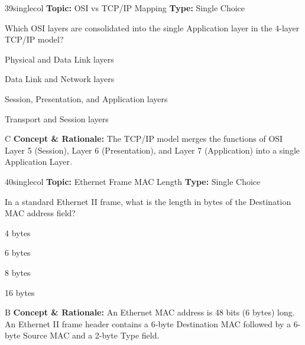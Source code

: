 \begin{qcard}{39}{singlecol}
\textcolor{darkslate!75}{\small\textbf{Topic:} OSI vs TCP/IP Mapping \hfill \textbf{Type:} Single Choice}\vspace{0.4em}\par
Which OSI layers are consolidated into the single Application layer in the 4-layer TCP/IP model?
\begin{qoptions}
\item Physical and Data Link layers
\item Data Link and Network layers
\item Session, Presentation, and Application layers
\item Transport and Session layers
\end{qoptions}
\end{qcard}
\nopagebreak
\begin{explainbox}{C}
\textbf{Concept \& Rationale:} The TCP/IP model merges the functions of OSI Layer 5 (Session), Layer 6 (Presentation), and Layer 7 (Application) into a single Application Layer.
\end{explainbox}

\begin{qcard}{40}{singlecol}
\textcolor{darkslate!75}{\small\textbf{Topic:} Ethernet Frame MAC Length \hfill \textbf{Type:} Single Choice}\vspace{0.4em}\par
In a standard Ethernet II frame, what is the length in bytes of the Destination MAC address field?
\begin{qoptions}
\item 4 bytes
\item 6 bytes
\item 8 bytes
\item 16 bytes
\end{qoptions}
\end{qcard}
\nopagebreak
\begin{explainbox}{B}
\textbf{Concept \& Rationale:} An Ethernet MAC address is 48 bits (6 bytes) long. An Ethernet II frame header contains a 6-byte Destination MAC followed by a 6-byte Source MAC and a 2-byte Type field.
\end{explainbox}

